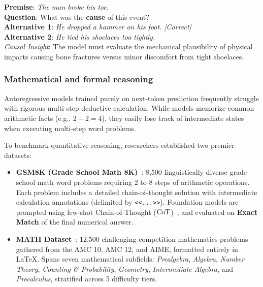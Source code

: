 \documentclass[../../main.tex]{subfiles}
\begin{document}
\begin{center}
\begin{minipage}{0.95\textwidth}
\begin{tcolorbox}[colback=cardBg,colframe=cardLine,arc=2pt,boxrule=0.5pt,title=\textbf{Task Example: Causal Reasoning (COPA)}]
\small\sffamily
\textbf{Premise}: \textit{The man broke his toe.} \\
\textbf{Question}: What was the \textbf{cause} of this event? \\
\textbf{Alternative 1}: \textit{He dropped a hammer on his foot.} \hfill \textit{[Correct]} \\
\textbf{Alternative 2}: \textit{He tied his shoelaces too tightly.} \\
\textit{Causal Insight}: The model must evaluate the mechanical plausibility of physical impacts causing bone fractures versus minor discomfort from tight shoelaces.
\end{tcolorbox}
\end{minipage}
\end{center}

\subsubsection{Mathematical and formal reasoning}
\label{subsec:mathematical_reasoning}
Autoregressive models trained purely on next-token prediction frequently struggle with rigorous multi-step deductive calculation. While models memorize common arithmetic facts (e.g., $2 + 2 = 4$), they easily lose track of intermediate states when executing multi-step word problems.

To benchmark quantitative reasoning, researchers established two premier datasets:
\begin{itemize}
    \item \textbf{GSM8K (Grade School Math 8K)}~\cite{cobbe2021gsm8k}: 8,500 linguistically diverse grade-school math word problems requiring 2 to 8 steps of arithmetic operations. Each problem includes a detailed chain-of-thought solution with intermediate calculation annotations (delimited by \texttt{<<...>>}). Foundation models are prompted using few-shot Chain-of-Thought ($\mathrm{CoT}$)~\cite{wei2022chain}, and evaluated on \textbf{Exact Match} of the final numerical answer.
    \item \textbf{MATH Dataset}~\cite{hendrycks2021math}: 12,500 challenging competition mathematics problems gathered from the AMC 10, AMC 12, and AIME, formatted entirely in \LaTeX. Spans seven mathematical subfields: \textit{Prealgebra}, \textit{Algebra}, \textit{Number Theory}, \textit{Counting \& Probability}, \textit{Geometry}, \textit{Intermediate Algebra}, and \textit{Precalculus}, stratified across 5 difficulty tiers.
\end{itemize}
\end{document}
